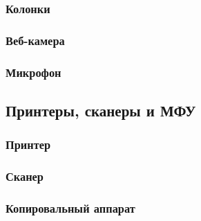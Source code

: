 \subsubsection{Колонки}\label{base:introduction:components:peripheral:loudspeaker}

\subsubsection{Веб-камера}\label{base:introduction:components:peripheral:webcam}

\subsubsection{Микрофон}\label{base:introduction:components:peripheral:microphone}

\subsection{Принтеры, сканеры и МФУ}\label{base:introduction:components:printers}
\subsubsection{Принтер}\label{base:introduction:components:printers:printer}

\subsubsection{Сканер}\label{base:introduction:components:printers:scanner}

\subsubsection{Копировальный аппарат}\label{base:introduction:components:printers:copier}

